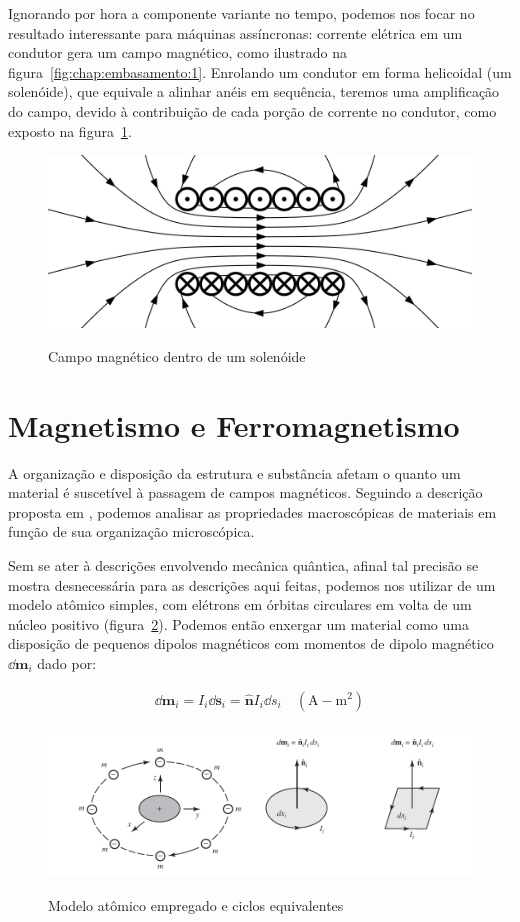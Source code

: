 \documentclass[
        12pt,                           %
        openright,                      %
        twoside,                        %
        a4paper,                        %
        english,                        %
        french,                         %
        spanish,                        %
        brazil                          %
        ]{abntex2}
\begin{document}
Ignorando por hora a componente variante no tempo, podemos nos focar no resultado
interessante para máquinas assíncronas: corrente elétrica em um condutor gera um
campo magnético, como ilustrado na figura~\ref{fig:chap:embasamento:1}. Enrolando
um condutor em forma helicoidal (um solenóide), que equivale a alinhar anéis em
sequência, teremos uma amplificação do campo, devido à contribuição de cada porção
de corrente no condutor, como exposto na figura~\ref{fig:chap:embasamento:2}.

\begin{figure}[!htp]
  \centering
  \includegraphics[width=0.5\columnwidth]{2560px-VFPt_Solenoid_correct2.svg.png}
  \label{fig:chap:embasamento:2}
  \caption{Campo magnético dentro de um solenóide}
\end{figure}

\section{Magnetismo e Ferromagnetismo}
A organização e disposição da estrutura e substância afetam o quanto um material
é suscetível à passagem de campos magnéticos. Seguindo a descrição proposta em
\cite{book:balanis}, podemos analisar as propriedades macroscópicas de materiais
em função de sua organização microscópica.

Sem se ater à descrições envolvendo mecânica quântica, afinal tal precisão se mostra
desnecessária para as descrições aqui feitas, podemos nos utilizar de um modelo
atômico simples, com elétrons em órbitas circulares em volta de um núcleo positivo
(figura~\ref{fig:chap:embasamento:3}). Podemos então enxergar um material como uma
disposição de pequenos dipolos magnéticos com momentos de dipolo magnético $\dd \bm{m}_i$
dado por:

\begin{gather}
  \dd{\bm{m}_i} = I_i \dd \bm{s}_i = \bm{\hat{n}}I_i \dd s_i \quad (\text{A}-\text{m}^2)
\end{gather}

\begin{figure}[!htp]
  \centering
  \includegraphics[width=0.9\columnwidth]{balanis3.png}
  \label{fig:chap:embasamento:3}
  \caption{Modelo atômico empregado e ciclos equivalentes \cite{book:balanis}}
\end{figure}
\end{document}
